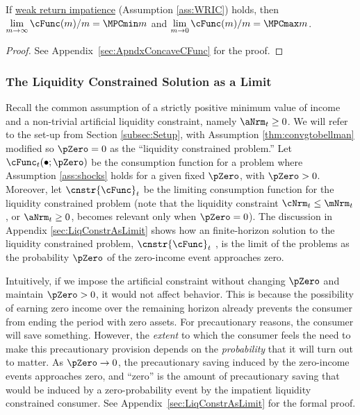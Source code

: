 \documentclass[BufferStockTheory]{subfiles}
\begin{document}
\begin{lemma}\label{lemma:MPCBoundsConvg}
If \hyperlink{WRIC}{weak return impatience} (Assumption \ref{ass:WRIC}) holds, then $\lim\limits_{m\rightarrow \infty} \cFunc (m)/m =\MPCmin m$ and $\lim\limits_{m\rightarrow 0} \cFunc (m)/m =\MPCmax m$.

\end{lemma}
\begin{proof}\let\qed\relax
See Appendix~\ref{sec:ApndxConcaveCFunc} for the proof.

\end{proof}


\hypertarget{The-Liquidity-Constrained-Solution-as-a-Limit}{}
\subsubsection{The Liquidity Constrained Solution as a Limit}\label{subsubsec:deatonIsLimit}

Recall the common assumption \citep{deatonLiqConstr,aiyagari:ge, lsIncFluct, mstIncFluct} of a strictly positive minimum value of income and a non-trivial artificial liquidity constraint, namely $\aNrm_{t}\geq 0$.
We will refer to the set-up from Section \ref{subsec:Setup}, with Assumption \ref{thm:convgtobellman} modified so $\pZero=0$ as the ``liquidity constrained problem.'' Let $\cFunc_{t}(\bullet;\pZero)$ be the consumption function for a problem where Assumption \ref{ass:shocks} holds for a given fixed $\pZero$, with $\pZero>0$.
Moreover, let $\cnstr{\cFunc}_{t}$ be the limiting consumption function for the liquidity constrained problem (note that the liquidity constraint $\cNrm_{t}\leq \mNrm_{t}$, or $\aNrm_{t}\geq 0$, becomes relevant only when $\pZero= 0$).
The discussion in Appendix \ref{sec:LiqConstrAsLimit} shows how an finite-horizon solution to the liquidity constrained problem, $\cnstr{\cFunc}_{t}$ , is the limit of the problems as the probability $\pZero$ of the zero-income event approaches zero.


Intuitively, if we impose the artificial constraint without changing $\pZero$ and maintain $\pZero>0$, it would not affect behavior.
This is because the possibility of earning zero income over the remaining horizon already prevents the consumer from ending the period with zero assets.
For precautionary reasons, the consumer will save something.
However, the \textit{extent} to which the consumer feels the need to make this precautionary provision depends on the \textit{probability} that it will turn out to matter.
As  $\pZero \rightarrow 0$, the   precautionary saving induced by the zero-income events approaches zero, and ``zero'' is the amount of precautionary saving that would be induced by a zero-probability event by the impatient liquidity constrained consumer.
See Appendix~\ref{sec:LiqConstrAsLimit} for the formal proof.
\end{document}
